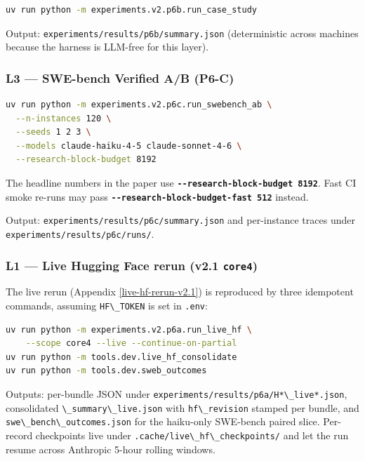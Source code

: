 \begin{lstlisting}[language=bash]
uv run python -m experiments.v2.p6b.run_case_study
\end{lstlisting}

Output: \passthrough{\lstinline!experiments/results/p6b/summary.json!} (deterministic across machines because the harness is LLM-free for this layer).

\subsubsection{L3 --- SWE-bench Verified A/B (P6-C)}\label{l3-swe-bench-verified-ab-p6-c}

\begin{lstlisting}[language=bash]
uv run python -m experiments.v2.p6c.run_swebench_ab \
  --n-instances 120 \
  --seeds 1 2 3 \
  --models claude-haiku-4-5 claude-sonnet-4-6 \
  --research-block-budget 8192
\end{lstlisting}

The headline numbers in the paper use \textbf{\passthrough{\lstinline!--research-block-budget 8192!}}. Fast CI smoke re-runs may pass \textbf{\passthrough{\lstinline!--research-block-budget-fast 512!}} instead.

Output: \passthrough{\lstinline!experiments/results/p6c/summary.json!} and per-instance traces under \passthrough{\lstinline!experiments/results/p6c/runs/!}.

\subsubsection{L1 --- Live Hugging Face rerun (v2.1 \texttt{core4})}\label{l1-live-hf-rerun-core4}

The live rerun (Appendix \ref{live-hf-rerun-v2.1}) is reproduced by three idempotent commands, assuming \passthrough{\lstinline!HF\_TOKEN!} is set in \passthrough{\lstinline!.env!}:

\begin{lstlisting}[language=bash]
uv run python -m experiments.v2.p6a.run_live_hf \
    --scope core4 --live --continue-on-partial
uv run python -m tools.dev.live_hf_consolidate
uv run python -m tools.dev.sweb_outcomes
\end{lstlisting}

Outputs: per-bundle JSON under \passthrough{\lstinline!experiments/results/p6a/H*\_live*.json!}, consolidated \passthrough{\lstinline!\_summary\_live.json!} with \passthrough{\lstinline!hf\_revision!} stamped per bundle, and \passthrough{\lstinline!swe\_bench\_outcomes.json!} for the haiku-only SWE-bench paired slice. Per-record checkpoints live under \passthrough{\lstinline!.cache/live\_hf\_checkpoints/!} and let the run resume across Anthropic 5-hour rolling windows.

